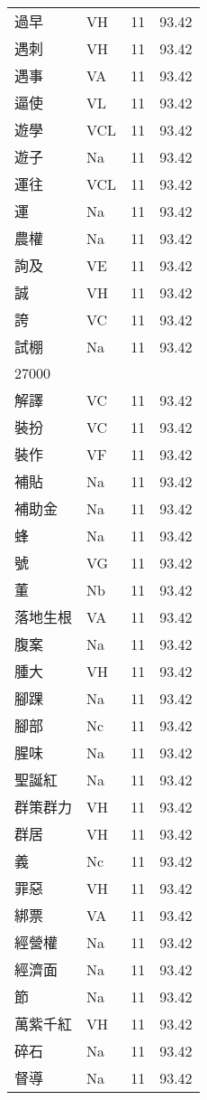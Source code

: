 \documentclass[twocolumn]{book}
\begin{document}
\begin{supertabular}{llrr}
過早 & VH & 11 &  93.42\\
遇刺 & VH & 11 &  93.42\\
遇事 & VA & 11 &  93.42\\
逼使 & VL & 11 &  93.42\\
遊學 & VCL & 11 &  93.42\\
遊子 & Na & 11 &  93.42\\
運往 & VCL & 11 &  93.42\\
運 & Na & 11 &  93.42\\
農權 & Na & 11 &  93.42\\
詢及 & VE & 11 &  93.42\\
誠 & VH & 11 &  93.42\\
誇 & VC & 11 &  93.42\\
試棚 & Na & 11 &  93.42\\
27000\\
解譯 & VC & 11 &  93.42\\
裝扮 & VC & 11 &  93.42\\
裝作 & VF & 11 &  93.42\\
補貼 & Na & 11 &  93.42\\
補助金 & Na & 11 &  93.42\\
蜂 & Na & 11 &  93.42\\
號 & VG & 11 &  93.42\\
董 & Nb & 11 &  93.42\\
落地生根 & VA & 11 &  93.42\\
腹案 & Na & 11 &  93.42\\
腫大 & VH & 11 &  93.42\\
腳踝 & Na & 11 &  93.42\\
腳部 & Nc & 11 &  93.42\\
腥味 & Na & 11 &  93.42\\
聖誕紅 & Na & 11 &  93.42\\
群策群力 & VH & 11 &  93.42\\
群居 & VH & 11 &  93.42\\
義 & Nc & 11 &  93.42\\
罪惡 & VH & 11 &  93.42\\
綁票 & VA & 11 &  93.42\\
經營權 & Na & 11 &  93.42\\
經濟面 & Na & 11 &  93.42\\
節 & Na & 11 &  93.42\\
萬紫千紅 & VH & 11 &  93.42\\
碎石 & Na & 11 &  93.42\\
督導 & Na & 11 &  93.42\\

\end{supertabular}
\end{document}
